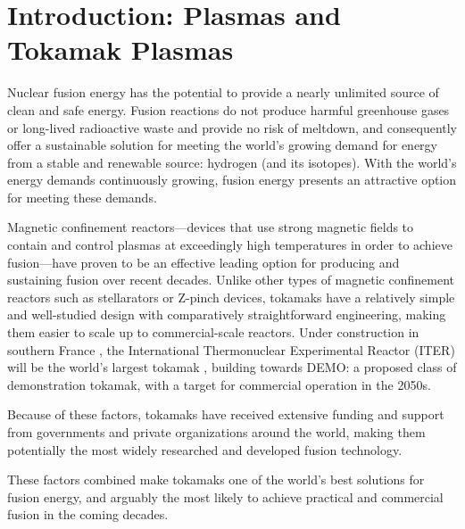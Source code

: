 \chapter{Introduction: Plasmas and Tokamak Plasmas}
    Nuclear fusion energy has the potential to provide a nearly unlimited source of clean and safe energy. Fusion reactions do not produce harmful greenhouse gases or long-lived radioactive waste and provide no risk of meltdown, and consequently offer a sustainable solution for meeting the world's growing demand for energy from a stable and renewable source: hydrogen (and its isotopes). With the world's energy demands continuously growing, fusion energy presents an attractive option for meeting these demands.

    \shortline
      
    Magnetic confinement reactors---devices that use strong magnetic fields to contain and control plasmas at exceedingly high temperatures in order to achieve fusion---have proven to be an effective leading option for producing and sustaining fusion over recent decades. Unlike other types of magnetic confinement reactors such as stellarators or Z-pinch devices, tokamaks have a relatively simple and well-studied design with comparatively straightforward engineering, making them easier to scale up to commercial-scale reactors. Under construction in southern France \cite{Claessens_2019}, the International Thermonuclear Experimental Reactor (ITER) will be the world's largest tokamak \cite{Meade_2009, ITER_plan}, building towards DEMO: a proposed class of demonstration tokamak, with a target for commercial operation in the 2050s.

    Because of these factors, tokamaks have received extensive funding and support from governments and private organizations around the world, making them potentially the most widely researched and developed fusion technology.

    These factors combined make tokamaks one of the world's best solutions for fusion energy, and arguably the most likely to achieve practical and commercial fusion in the coming decades.

